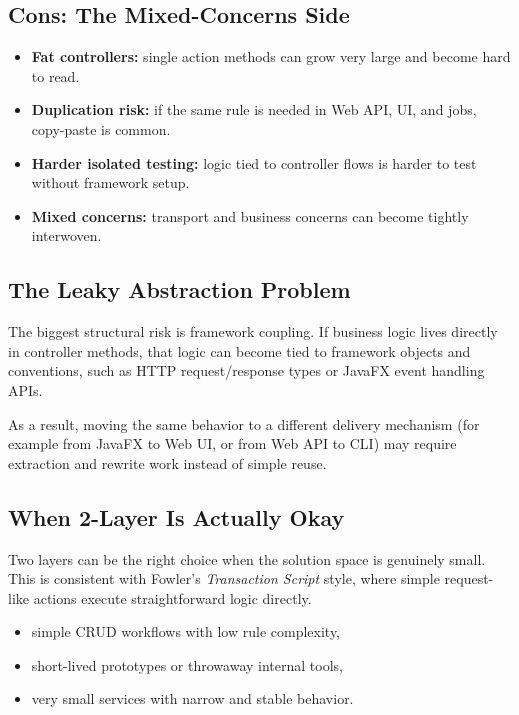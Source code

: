 \subsection{Cons: The Mixed-Concerns Side}
\label{sec:2_layered_cons}

\begin{itemize}
    \item \textbf{Fat controllers:} single action methods can grow very large and become hard to read.
    \item \textbf{Duplication risk:} if the same rule is needed in Web API, UI, and jobs, copy-paste is common.
    \item \textbf{Harder isolated testing:} logic tied to controller flows is harder to test without framework setup.
    \item \textbf{Mixed concerns:} transport and business concerns can become tightly interwoven.
\end{itemize}

\subsection{The Leaky Abstraction Problem}
\label{sec:2_layered_leaky_abstraction}

The biggest structural risk is framework coupling. If business logic lives directly in controller methods, that logic can become tied to framework objects and conventions, such as HTTP request/response types or JavaFX event handling APIs.

As a result, moving the same behavior to a different delivery mechanism (for example from JavaFX to Web UI, or from Web API to CLI) may require extraction and rewrite work instead of simple reuse.

\subsection{When 2-Layer Is Actually Okay}
\label{sec:2_layered_when_okay}

Two layers can be the right choice when the solution space is genuinely small. This is consistent with Fowler's \textit{Transaction Script} style,\autocite{fowler2002patterns} where simple request-like actions execute straightforward logic directly.

\begin{itemize}
    \item simple CRUD workflows with low rule complexity,
    \item short-lived prototypes or throwaway internal tools,
    \item very small services with narrow and stable behavior.
\end{itemize}

